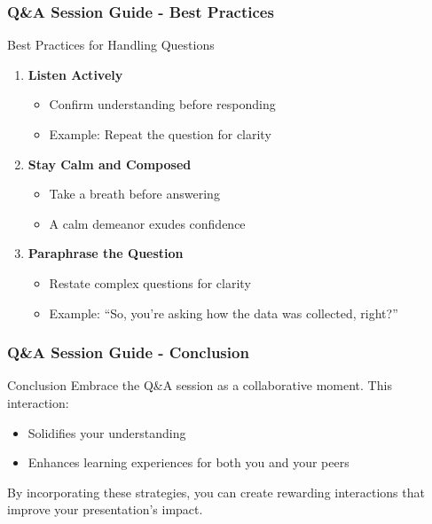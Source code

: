 \documentclass{beamer}
\begin{document}
\begin{frame}[fragile]
    \frametitle{Q\&A Session Guide - Best Practices}
    \begin{block}{Best Practices for Handling Questions}
        \begin{enumerate}
            \item \textbf{Listen Actively}
                \begin{itemize}
                    \item Confirm understanding before responding
                    \item Example: Repeat the question for clarity
                \end{itemize}
            \item \textbf{Stay Calm and Composed}
                \begin{itemize}
                    \item Take a breath before answering
                    \item A calm demeanor exudes confidence
                \end{itemize}
            \item \textbf{Paraphrase the Question}
                \begin{itemize}
                    \item Restate complex questions for clarity
                    \item Example: “So, you're asking how the data was collected, right?”
                \end{itemize}
        \end{enumerate}
    \end{block}
\end{frame}

\begin{frame}[fragile]
    \frametitle{Q\&A Session Guide - Conclusion}
    \begin{block}{Conclusion}
        Embrace the Q\&A session as a collaborative moment. This interaction:
        \begin{itemize}
            \item Solidifies your understanding
            \item Enhances learning experiences for both you and your peers
        \end{itemize}
        By incorporating these strategies, you can create rewarding interactions that improve your presentation's impact.
    \end{block}
\end{frame}
\end{document}
